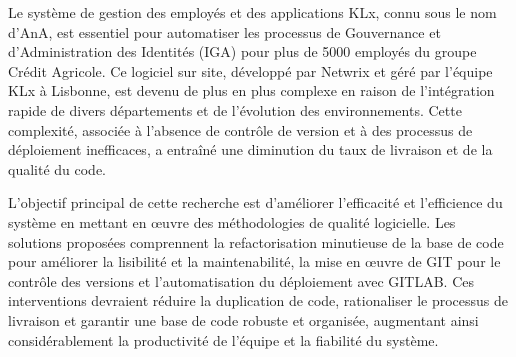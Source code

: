 
%

Le système de gestion des employés et des applications KLx, connu sous le nom d'AnA, est essentiel pour automatiser les processus de Gouvernance et d'Administration des Identités (IGA) pour plus de 5000 employés du groupe Crédit Agricole. Ce logiciel sur site, développé par Netwrix et géré par l'équipe KLx à Lisbonne, est devenu de plus en plus complexe en raison de l'intégration rapide de divers départements et de l'évolution des environnements. Cette complexité, associée à l'absence de contrôle de version et à des processus de déploiement inefficaces, a entraîné une diminution du taux de livraison et de la qualité du code.

L'objectif principal de cette recherche est d'améliorer l'efficacité et l'efficience du système en mettant en œuvre des méthodologies de qualité logicielle. Les solutions proposées comprennent la refactorisation minutieuse de la base de code pour améliorer la lisibilité et la maintenabilité, la mise en œuvre de GIT pour le contrôle des versions et l'automatisation du déploiement avec GITLAB. Ces interventions devraient réduire la duplication de code, rationaliser le processus de livraison et garantir une base de code robuste et organisée, augmentant ainsi considérablement la productivité de l'équipe et la fiabilité du système.

